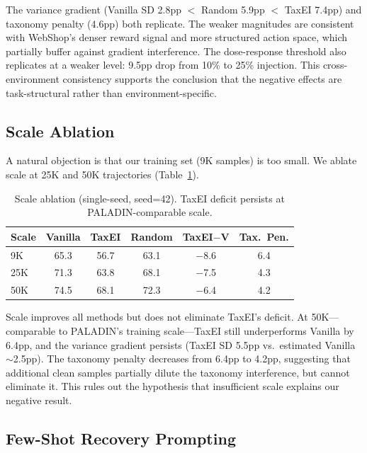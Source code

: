 \documentclass[11pt,a4paper]{article}
\begin{document}
The variance gradient (Vanilla SD 2.8pp $<$ Random 5.9pp $<$ TaxEI 7.4pp) and taxonomy penalty (4.6pp) both replicate. The weaker magnitudes are consistent with WebShop's denser reward signal and more structured action space, which partially buffer against gradient interference. The dose-response threshold also replicates at a weaker level: 9.5pp drop from 10\% to 25\% injection. This cross-environment consistency supports the conclusion that the negative effects are task-structural rather than environment-specific.

\subsection{Scale Ablation}
\label{sec:scale}

A natural objection is that our training set (9K samples) is too small. We ablate scale at 25K and 50K trajectories (Table~\ref{tab:scale}).

\begin{table}[t]
\centering
\small
\begin{tabular}{lccccc}
\toprule
\textbf{Scale} & \textbf{Vanilla} & \textbf{TaxEI} & \textbf{Random} & \textbf{TaxEI$-$V} & \textbf{Tax.\ Pen.} \\
\midrule
9K  & 65.3 & 56.7 & 63.1 & $-$8.6 & 6.4 \\
25K & 71.3 & 63.8 & 68.1 & $-$7.5 & 4.3 \\
50K & 74.5 & 68.1 & 72.3 & $-$6.4 & 4.2 \\
\bottomrule
\end{tabular}
\caption{Scale ablation (single-seed, seed=42). TaxEI deficit persists at PALADIN-comparable scale.}
\label{tab:scale}
\end{table}

Scale improves all methods but does not eliminate TaxEI's deficit. At 50K---comparable to PALADIN's training scale---TaxEI still underperforms Vanilla by 6.4pp, and the variance gradient persists (TaxEI SD 5.5pp vs.\ estimated Vanilla ${\sim}$2.5pp). The taxonomy penalty decreases from 6.4pp to 4.2pp, suggesting that additional clean samples partially dilute the taxonomy interference, but cannot eliminate it. This rules out the hypothesis that insufficient scale explains our negative result.

\subsection{Few-Shot Recovery Prompting}
\label{sec:fewshot}
\end{document}
